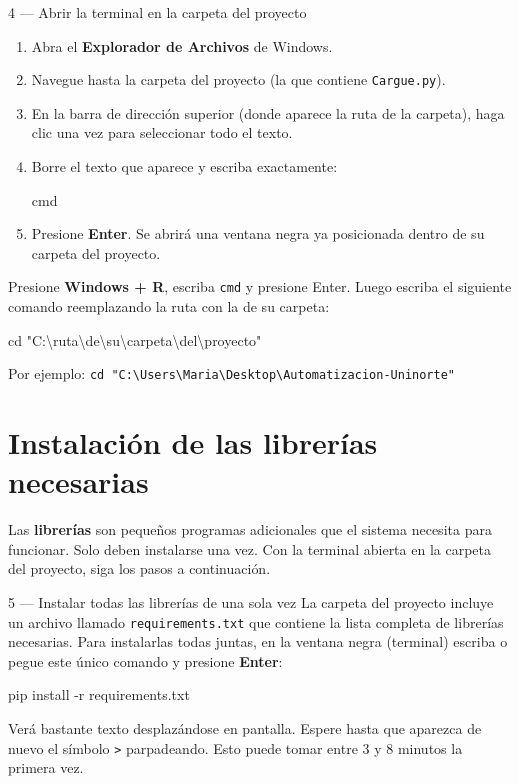 \documentclass[12pt, letterpaper]{article}
\begin{document}
\begin{paso}{4 — Abrir la terminal en la carpeta del proyecto}
  \begin{enumerate}[leftmargin=0.5cm, label=\textcolor{uninorteazul}{\arabic*.}]
    \item Abra el \textbf{Explorador de Archivos} de Windows.
    \item Navegue hasta la carpeta del proyecto (la que contiene \texttt{Cargue.py}).
    \item En la barra de dirección superior (donde aparece la ruta de la carpeta), haga clic una vez para seleccionar todo el texto.
    \item Borre el texto que aparece y escriba exactamente:
    \begin{comando}
      cmd
    \end{comando}
    \item Presione \textbf{Enter}. Se abrirá una ventana negra ya posicionada dentro de su carpeta del proyecto.
  \end{enumerate}
\end{paso}

\begin{aviso}
  Presione \textbf{Windows + R}, escriba \texttt{cmd} y presione Enter. Luego escriba el siguiente comando reemplazando la ruta con la de su carpeta:
  \begin{comando}
    cd "C:\textbackslash{}ruta\textbackslash{}de\textbackslash{}su\textbackslash{}carpeta\textbackslash{}del\textbackslash{}proyecto"
  \end{comando}
  Por ejemplo: \texttt{cd "C:\textbackslash{}Users\textbackslash{}Maria\textbackslash{}Desktop\textbackslash{}Automatizacion-Uninorte"}
\end{aviso}

\section{Instalación de las librerías necesarias}

Las \textbf{librerías} son pequeños programas adicionales que el sistema necesita para funcionar. Solo deben instalarse una vez. Con la terminal abierta en la carpeta del proyecto, siga los pasos a continuación.

\begin{paso}{5 — Instalar todas las librerías de una sola vez}
  La carpeta del proyecto incluye un archivo llamado \texttt{requirements.txt} que contiene la lista completa de librerías necesarias. Para instalarlas todas juntas, en la ventana negra (terminal) escriba o pegue este único comando y presione \textbf{Enter}:
  \begin{comando}
    pip install -r requirements.txt
  \end{comando}
  Verá bastante texto desplazándose en pantalla. Espere hasta que aparezca de nuevo el símbolo \texttt{>} parpadeando. Esto puede tomar entre 3 y 8 minutos la primera vez.
\end{paso}
\end{document}
